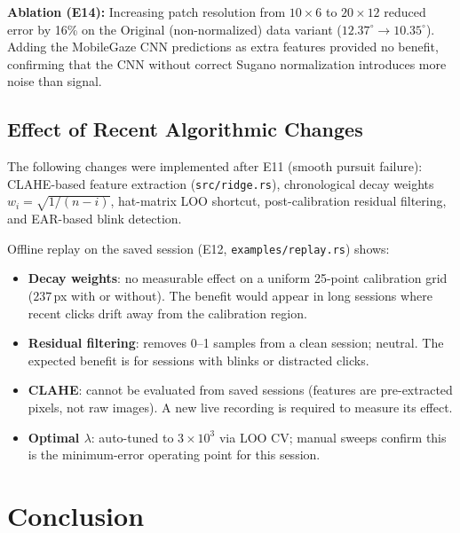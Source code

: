 \documentclass[11pt,a4paper]{article}
\begin{document}
\textbf{Ablation (E14):} Increasing patch resolution from $10\times6$ to $20\times12$
reduced error by 16\% on the Original (non-normalized) data variant ($12.37^\circ \to 10.35^\circ$).
Adding the MobileGaze CNN predictions as extra features provided no benefit, confirming
that the CNN without correct Sugano normalization introduces more noise than signal.

\subsection{Effect of Recent Algorithmic Changes}

The following changes were implemented after E11 (smooth pursuit failure):
CLAHE-based feature extraction (\texttt{src/ridge.rs}),
chronological decay weights $w_i = \sqrt{1/(n-i)}$,
hat-matrix LOO shortcut,
post-calibration residual filtering,
and EAR-based blink detection.

Offline replay on the saved session (E12, \texttt{examples/replay.rs}) shows:

\begin{itemize}
  \item \textbf{Decay weights}: no measurable effect on a uniform 25-point calibration grid ($237$\,px with or without). The benefit would appear in long sessions where recent clicks drift away from the calibration region.
  \item \textbf{Residual filtering}: removes 0--1 samples from a clean session; neutral. The expected benefit is for sessions with blinks or distracted clicks.
  \item \textbf{CLAHE}: cannot be evaluated from saved sessions (features are pre-extracted pixels, not raw images). A new live recording is required to measure its effect.
  \item \textbf{Optimal $\lambda$}: auto-tuned to $3\times10^3$ via LOO CV; manual sweeps confirm this is the minimum-error operating point for this session.
\end{itemize}

\section{Conclusion}
\label{sec:conclusion}
\end{document}
